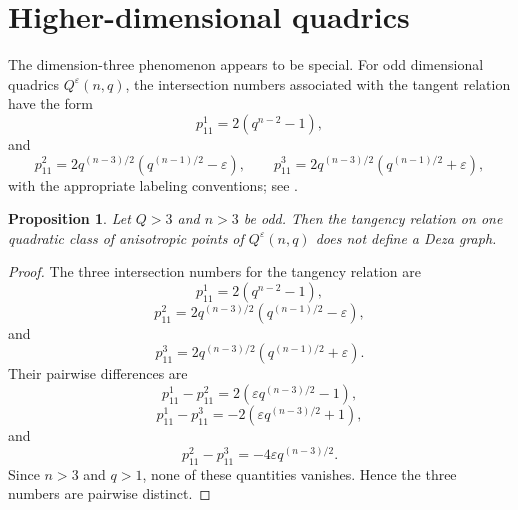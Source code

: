 \documentclass{article}
\theoremstyle{plain}
\newtheorem{prop}[thm]{Proposition}
\newtheorem{rem}[thm]{Remark}
\newtheorem{prob}[thm]{Problem}
\begin{document}

\section{Higher-dimensional quadrics}

The dimension-three phenomenon appears to be special.  For odd
dimensional quadrics $Q^\varepsilon(n,q)$, the intersection
numbers associated with the tangent relation have the form
\[
 p_{11}^{1}=2(q^{n-2}-1),
\]
and
\[
 p_{11}^{2}
 =2q^{(n-3)/2}
   \left(q^{(n-1)/2}-\varepsilon\right),
 \qquad
 p_{11}^{3}
 =2q^{(n-3)/2}
   \left(q^{(n-1)/2}+\varepsilon\right),
\]
with the appropriate labeling conventions; see
\cite{AdriaensenDeBoeck2025}. 
\begin{prop}
Let $Q>3$ and $n>3$ be odd. Then the tangency relation on one quadratic class of anisotropic points of $Q^\varepsilon(n,q)$ does not define a Deza graph.
\end{prop}

\begin{proof}
The three intersection numbers for the tangency relation are \[
p_{11}^1=2(q^{n-2}-1),
\]
\[
p_{11}^2=
2q^{(n-3)/2}
\left(q^{(n-1)/2}-\varepsilon\right),
\]
and
\[
p_{11}^3=
2q^{(n-3)/2}
\left(q^{(n-1)/2}+\varepsilon\right).
\]
Their pairwise differences are
\[
p_{11}^1-p_{11}^2
=
2\left(\varepsilon q^{(n-3)/2}-1\right),
\]
\[
p_{11}^1-p_{11}^3
=
-2\left(\varepsilon q^{(n-3)/2}+1\right),
\]
and
\[
p_{11}^2-p_{11}^3
=
-4\varepsilon q^{(n-3)/2}.
\]
Since $n>3$ and $q>1$, none of these quantities vanishes. Hence the three numbers are pairwise distinct.
\end{proof}
\end{document}
